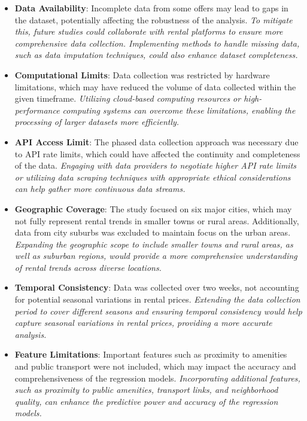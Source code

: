 \begin{itemize}
    \item \textbf{Data Availability}: Incomplete data from some offers may lead to gaps in the dataset, potentially affecting the robustness of the analysis. \textit{To mitigate this, future studies could collaborate with rental platforms to ensure more comprehensive data collection. Implementing methods to handle missing data, such as data imputation techniques, could also enhance dataset completeness.}
    
    \item \textbf{Computational Limits}: Data collection was restricted by hardware limitations, which may have reduced the volume of data collected within the given timeframe. \textit{Utilizing cloud-based computing resources or high-performance computing systems can overcome these limitations, enabling the processing of larger datasets more efficiently.}
    
    \item \textbf{API Access Limit}: The phased data collection approach was necessary due to API rate limits, which could have affected the continuity and completeness of the data. \textit{Engaging with data providers to negotiate higher API rate limits or utilizing data scraping techniques with appropriate ethical considerations can help gather more continuous data streams.}
    
    \item \textbf{Geographic Coverage}: The study focused on six major cities, which may not fully represent rental trends in smaller towns or rural areas. Additionally, data from city suburbs was excluded to maintain focus on the urban areas. \textit{Expanding the geographic scope to include smaller towns and rural areas, as well as suburban regions, would provide a more comprehensive understanding of rental trends across diverse locations.}
    
    \item \textbf{Temporal Consistency}: Data was collected over two weeks, not accounting for potential seasonal variations in rental prices. \textit{Extending the data collection period to cover different seasons and ensuring temporal consistency would help capture seasonal variations in rental prices, providing a more accurate analysis.}
    
    \item \textbf{Feature Limitations}: Important features such as proximity to amenities and public transport were not included, which may impact the accuracy and comprehensiveness of the regression models. \textit{Incorporating additional features, such as proximity to public amenities, transport links, and neighborhood quality, can enhance the predictive power and accuracy of the regression models.}
\end{itemize}

